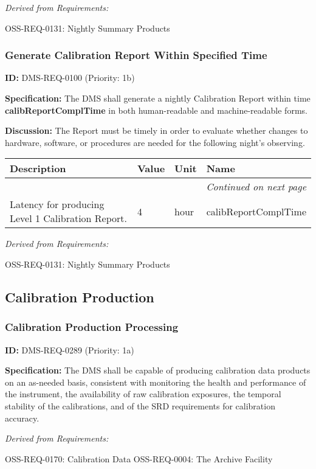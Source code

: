 \documentclass[SE,toc,lsstdraft]{lsstdoc}
\makeatletter
\newcommand{\paramname}[1]{\hspace{0pt}#1}
\newcommand{\unitname}[1]{\hspace{0pt}#1}
\newenvironment{parameters}[0]{%
\setlength\LTleft{0pt}
\setlength\LTright{\fill}
\begin{small}
\begin{longtable}[]{|p{0.49\textwidth}|l|p{0.6in}|p{1.70in}@{}|}

\hline \textbf{Description} & \textbf{Value} & \textbf{Unit} & \textbf{Name} \\ \hline
\endhead

\hline \multicolumn{4}{r}{\emph{Continued on next page}} \\
\endfoot

\hline\hline
\endlastfoot
}{%
\hline
\end{longtable}
\end{small}
}
\makeatother
\begin{document}
\emph{Derived from Requirements:}

OSS-REQ-0131:
Nightly Summary Products \newline

\subsubsection{Generate Calibration Report Within Specified Time}

\label{DMS-REQ-0100}
\textbf{ID:} DMS-REQ-0100 (Priority: 1b)

\textbf{Specification:} The DMS shall generate a nightly Calibration Report within time \textbf{calibReportComplTime }in both human-readable and machine-readable forms.

\textbf{Discussion:} The Report must be timely in order to evaluate whether changes to hardware, software, or procedures are needed for the following night's observing.

\begin{parameters}
Latency for producing Level 1 Calibration Report.
&
4
&
\unitname{%
hour
}
&
\paramname{%
calibReportComplTime
} \\\hline
\end{parameters}

\emph{Derived from Requirements:}

OSS-REQ-0131:
Nightly Summary Products \newline

\subsection{Calibration Production}

\subsubsection{Calibration Production Processing}

\label{DMS-REQ-0289}
\textbf{ID:} DMS-REQ-0289 (Priority: 1a)

\textbf{Specification:} The DMS shall be capable of producing calibration data products on an as-needed basis, consistent with monitoring the health and performance of the instrument, the availability of raw calibration exposures, the temporal stability of the calibrations, and of the SRD requirements for calibration accuracy.

\emph{Derived from Requirements:}

OSS-REQ-0170:
Calibration Data \newline
OSS-REQ-0004:
The Archive Facility \newline
\end{document}
